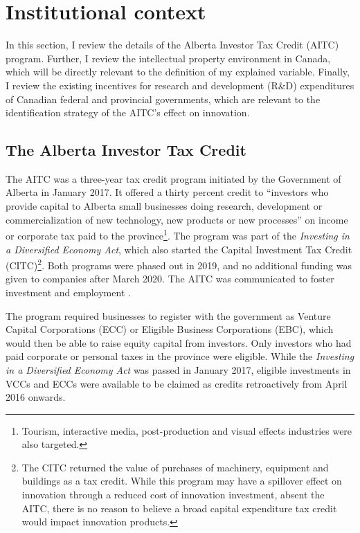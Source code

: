 \documentclass[../main.tex]{subfiles}
\begin{document}
\section{Institutional context}
\label{sec:institutional_background}

In this section, I review the details of the Alberta Investor Tax Credit (AITC) program. Further, I review the intellectual property environment in Canada, which will be directly relevant to the definition of my explained variable. Finally, I review the existing incentives for research and development (R\&D) expenditures of Canadian federal and provincial governments, which are relevant to the identification strategy of the AITC's effect on innovation.

\subsection{The Alberta Investor Tax Credit}

The AITC was a three-year tax credit program initiated by the Government of Alberta in January 2017. It offered a thirty percent credit to \enquote{investors who provide capital to Alberta small businesses doing research, development or commercialization of new technology, new products or new processes} \parencite[p.1]{albertaeconomicdevelopmentandtrade17} on income or corporate tax paid to the province\footnote{Tourism, interactive media, post-production and visual effects industries were also targeted.}. The program was part of the \textit{Investing in a Diversified Economy Act}\nocite{Investing16}, which also started the Capital Investment Tax Credit (CITC)\footnote{The CITC returned the value of purchases of machinery, equipment and buildings as a tax credit. While this program may have a spillover effect on innovation through a reduced cost of innovation investment, absent the AITC, there is no reason to believe a broad capital expenditure tax credit would impact innovation products.}. Both programs were phased out in 2019, and no additional funding was given to companies after March 2020. The AITC was communicated to foster investment and employment \parencite{albertaeconomicdevelopmentandtrade17,albertaeconomicdevelopmentandtrade19,zabjeck16}.

The program required businesses to register with the government as Venture Capital Corporations (ECC) or Eligible Business Corporations (EBC), which would then be able to raise equity capital from investors. Only investors who had paid corporate or personal taxes in the province were eligible. While the \textit{Investing in a Diversified Economy Act} was passed in January 2017, eligible investments in VCCs and ECCs were available to be claimed as credits retroactively from April 2016 onwards.
\end{document}
